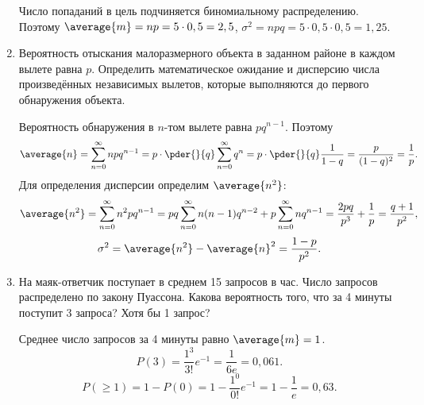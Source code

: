 \begin{enumerate}
            Число попаданий в цель подчиняется биномиальному распределению.
            Поэтому \( \average{m} = np = 5 \cdot 0,5 = 2,5 \),
            \( \sigma^2 = npq = 5 \cdot 0,5 \cdot 0,5 = 1,25 \).
        \item Вероятность отыскания малоразмерного объекта в заданном районе в
            каждом вылете равна \( p \). Определить математическое ожидание и
            дисперсию числа произведённых независимых вылетов, которые
            выполняются до первого обнаружения объекта.

            Вероятность обнаружения в \( n \)-том вылете равна \( pq^{n-1} \).
            Поэтому
            \[
                \average{n} = \sum_{n=0}^\infty npq^{n-1} =
                p\cdot\pder{}{q}\sum_{n=0}^\infty q^n =
                p\cdot\pder{}{q}\frac{1}{1-q} = \frac{p}{(1-q)^2} = \frac{1}{p}.
            \]
            Для определения дисперсии определим \( \average{n^2} \):
            \[
                \average{n^2} = \sum_{n=0}^\infty n^2 p q^{n-1} =
                pq\sum_{n=0}^\infty n(n-1) q^{n-2} +
                p\sum_{n=0}^\infty n q^{n-1} = \frac{2pq}{p^3} + \frac{1}{p} =
                \frac{q+1}{p^2},
            \]
            \[
                \sigma^2 = \average{n^2} - \average{n}^2 = \frac{1-p}{p^2}.
            \]
        \item На маяк-ответчик поступает в среднем 15 запросов в час. Число
            запросов распределено по закону Пуассона. Какова вероятность
            того, что за 4 минуты поступит 3 запроса? Хотя бы 1 запрос?

            Среднее число запросов за 4 минуты равно \( \average{m} = 1 \).
            \[
                P(3) = \frac{1^3}{3!}e^{-1} = \frac{1}{6e} = 0,061.
            \]
            \[
                P(\ge 1) = 1 - P(0) = 1 - \frac{1^0}{0!}e^{-1} = 1 - \frac{1}{e}
                =0,63.
            \]
    \end{enumerate}
